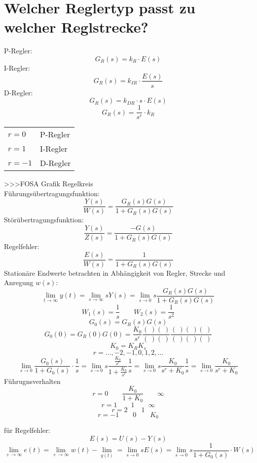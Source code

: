 \section{Welcher Reglertyp passt zu welcher Reglstrecke?}
P-Regler: 
\[ G_R(s) = k_R \cdot E(s) \]
I-Regler: 
\[ G_R(s) = k_{IR} \cdot \frac{E(s)}{s} \]
D-Regler: 
\[ G_R(s) = k_{DR} \cdot s \cdot E(s) \]
\[  G_R(s) = \frac{1}{s^r} \cdot k_R\]
\begin{tabular}{ll}
$r =  0$ & P-Regler \\
$r =  1$ & I-Regler \\
$r = -1$ & D-Regler \\
\end{tabular}
>>>FOSA Grafik Regelkreis\\
Führungsübertragungsfunktion: 
\[ \frac{Y(s)}{W(s)} = \frac{G_R(s) G(s)}{1 + G_R(s) G(s)} \]
Störübertragungsfunktion: 
\[ \frac{Y(s)}{Z(s)} = \frac{-G(s)}{1 + G_R(s) G(s)} \]
Regelfehler: 
\[ \frac{E(s)}{W(s)} = \frac{1}{1 + G_R(s) G(s)} \]
Stationäre Endwerte betrachten in Abhängigkeit von Regler, Strecke und 
Anregung $w(s)$: 
\[ \lim\limits_{t\to \infty} y(t) = \lim\limits_{s \to \infty} s Y(s) 
= \lim\limits_{s \to 0} s \frac{G_R(s) G(s)}{1 + G_R(s) G(s)} \]
\[ W_1(s) = \frac{1}{s} \qquad W_2(s) = \frac{1}{s^2} \]
\[ G_0(s) = G_R(s) G(s) \]
\[ G_0(0) = G_R(0) G(0) = \frac{K_0}{s^r} \frac{(~)(~)}{(~)(~)} 
\frac{(~)(~)(~)}{(~)(~)(~)} \]
\[ K_0 = K_R K_s \]
\[ r = \ldots, -2, -1, 0, 1, 2, \ldots \]
\[ \lim\limits_{s \to 0} \frac{G_0(s)}{1 + G_0(s)} \cdot \frac{1}{s} 
= \lim\limits_{s \to 0} s \frac{\frac{K_0}{s^r}}{1 + \frac{K_0}{s^r}} \frac{1}{s} 
= \lim\limits_{s \to 0} s \frac{K_0}{s^r + K_0} \frac{1}{s} 
= \lim\limits_{s \to 0} \frac{K_0}{s^r + K_0} \]
Führugnsverhalten
\[ r = 0 \qquad \frac{K_0}{1 + K_0} \qquad \infty \]
\[ r = 1 \qquad 1 \qquad \infty \]
\[ r = 2 \qquad 1 \]
\[ r = -1 \qquad 0 \qquad K_0 \]

für Regelfehler: 
\[ E(s) = U(s) - Y(s) \]
\[ \lim\limits_{+ \to \infty} e(t) = \lim\limits_{+ \to \infty} w(t) 
- \lim\limits_{y(t)} = \lim\limits_{s \to 0} s E(s) = \lim\limits_{s \to 0} s \frac{1}{1 + G_0(s)} \cdot W(s) \]


